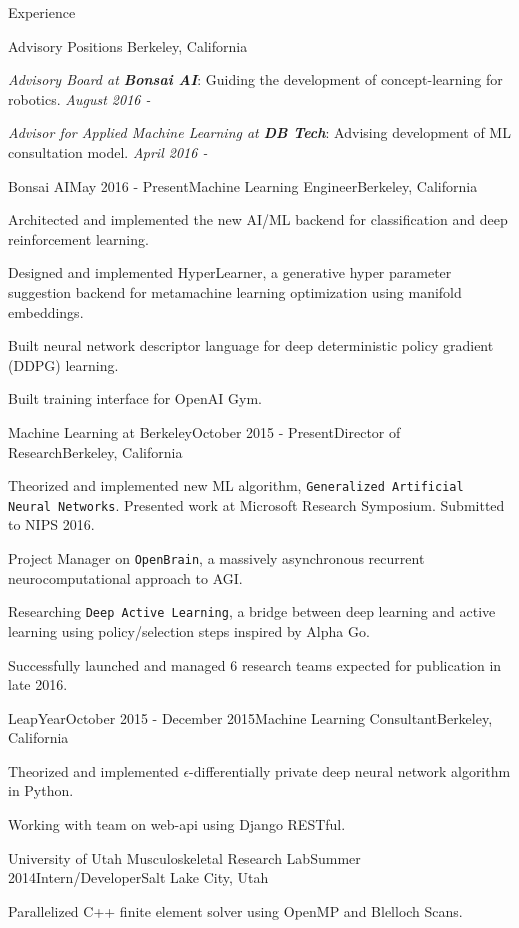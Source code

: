 \documentclass{resume} %
\begin{document}
\begin{rSection}{Experience}

\begin{rSubsection}{Advisory Positions}{ }{}{Berkeley, California}
\item \emph{Advisory Board at \textbf{Bonsai AI}}: Guiding the development of concept-learning for robotics. \hfill \emph{August 2016 -}
\item \emph{Advisor for Applied Machine Learning at \textbf{DB Tech}}: Advising development of ML consultation model. \hfill \emph{April 2016 - }
\end{rSubsection}

\begin{rSubsection}{Bonsai AI}{May 2016 - Present}{Machine Learning Engineer}{Berkeley, California}
\item Architected and implemented the new AI/ML backend for classification and deep reinforcement learning.
\item Designed and implemented HyperLearner, a generative hyper parameter suggestion backend for metamachine learning optimization using manifold embeddings.
\item Built neural network descriptor language for deep deterministic policy gradient (DDPG) learning.
\item Built training interface for OpenAI Gym.
\end{rSubsection}

\begin{rSubsection}{Machine Learning at Berkeley}{October 2015 - Present}{Director of Research}{Berkeley, California}
\item Theorized and implemented new ML algorithm, \texttt{Generalized Artificial Neural Networks}. Presented work at Microsoft Research Symposium. Submitted to NIPS 2016.
\item Project Manager on \texttt{OpenBrain}, a massively asynchronous recurrent neurocomputational approach to AGI.
\item Researching \texttt{Deep Active Learning}, a bridge between deep learning and active learning using policy/selection steps inspired by Alpha Go.
\item Successfully launched and managed 6 research teams expected for publication in late 2016.
\end{rSubsection}


\begin{rSubsection}{LeapYear}{October 2015 - December 2015}{Machine Learning Consultant}{Berkeley, California}
\item Theorized and implemented $\epsilon$-differentially private deep neural network algorithm in Python.
\item Working with team on web-api using Django RESTful.
\end{rSubsection}
\begin{rSubsection}{University of Utah Musculoskeletal Research Lab}{Summer 2014}{Intern/Developer}{Salt Lake City, Utah}
\item Parallelized C++ finite element solver using OpenMP and Blelloch Scans.
\end{rSubsection}


\end{rSection}
\end{document}
